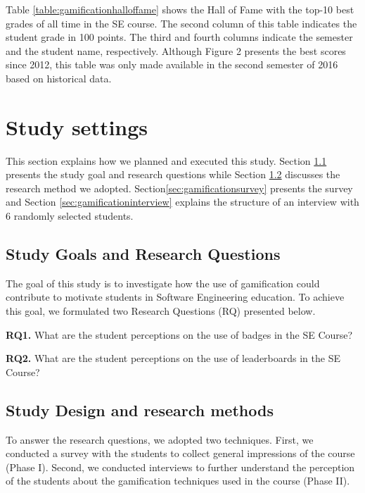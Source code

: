 

Table \ref{table:gamificationhalloffame} shows the Hall of Fame with the top-10 best grades of all time in the SE course. The second column of this table indicates the student grade in 100 points. The third and fourth columns indicate the semester and the student name, respectively. Although Figure 2 presents the best scores since 2012, this table was only made available in the second semester of 2016 based on historical data.

\section{Study settings}
\label{sec:gamificationstudysettings}

This section explains how we planned and executed this study. Section \ref{sec:gamificationgoals} presents the study goal and research questions while Section \ref{sec:gamificationmethod} discusses the research method we adopted. Section\ref{sec:gamificationsurvey} presents the survey and Section \ref{sec:gamificationinterview} explains the structure of an interview with 6 randomly selected students.

\subsection{Study Goals and Research Questions}
\label{sec:gamificationgoals}

The goal of this study is to investigate how the use of gamification could contribute to motivate students in Software Engineering education. To achieve this goal, we formulated two Research Questions (RQ) presented below.

\textbf{RQ1.} What are the student perceptions on the use of badges in the SE Course?

\textbf{RQ2.} What are the student perceptions on the use of leaderboards in the SE Course?

\subsection{Study Design and research methods}
\label{sec:gamificationmethod}

To answer the research questions, we adopted two techniques. First, we conducted a survey with the students to collect general impressions of the course (Phase I). Second, we conducted interviews to further understand the perception of the students about the gamification techniques used in the course (Phase II).

